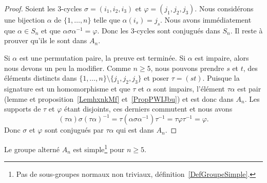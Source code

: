 \begin{proof}
	Soient les \( 3\)-cycles \( \sigma=(i_1,i_2,i_3)\) et \( \varphi=(j_1,j_2,j_3)\). Nous considérons une bijection \( \alpha\) de \( \{ 1,\ldots, n \}\) telle que \( \alpha(i_s)=j_s\). Nous avons immédiatement que \( \alpha\in S_n\) et que \( \alpha\sigma\alpha^{-1}=\varphi\). Donc les \( 3\)-cycles sont conjugués dans \( S_n\). Il reste à prouver qu'ils le sont dans \( A_n\).

	Si \( \alpha\) est une permutation paire, la preuve est terminée. Si \( \alpha\) est impaire, alors nous devons un peu la modifier. Comme \( n\geq 5\), nous pouvons prendre \( s\) et \( t\), des éléments distincts dans \( \{ 1,\ldots, n \}\setminus\{ j_1,j_2,j_3 \}\) et poser \( \tau=(st)\). Puisque la signature est un homomorphisme et que \( \tau\) et \( \alpha\) sont impairs, l'élément \( \tau\alpha\) est pair (lemme et proposition~\ref{LemhxnkMf} et~\ref{PropPWIJbu}) et est donc dans \( A_n\). Les supports de \( \tau\) et \( \varphi\) étant disjoints, ces derniers commutent et nous avons
	\begin{equation}
		(\tau\alpha)\sigma(\tau\alpha)^{-1}=\tau(\alpha\sigma\alpha^{-1})\tau^{-1}=\tau\varphi\tau^{-1} = \varphi.
	\end{equation}
	Donc \( \sigma\) et \( \varphi\) sont conjugués par \( \tau\alpha\) qui est dans \( A_n\).
\end{proof}

\begin{theorem} \label{ThoURfSUXP}
	Le groupe alterné \( A_n\) est simple\footnote{Pas de sous-groupes normaux non triviaux, définition~\ref{DefGroupeSimple}.} pour \( n\geq 5\).
\end{theorem}


